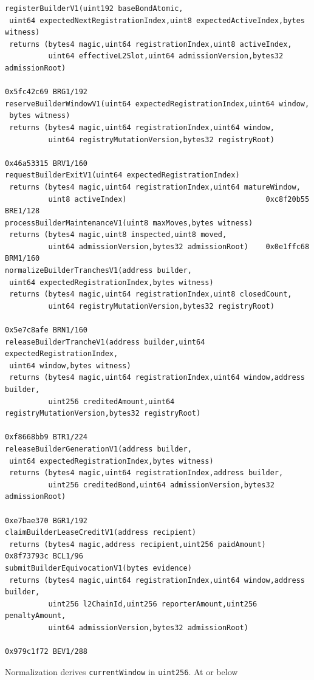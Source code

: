 \documentclass[a4paper,11pt]{article}
\newcommand{\code}[1]{\nolinkurl{#1}}
\begin{document}
\begin{verbatim}
registerBuilderV1(uint192 baseBondAtomic,
 uint64 expectedNextRegistrationIndex,uint8 expectedActiveIndex,bytes witness)
 returns (bytes4 magic,uint64 registrationIndex,uint8 activeIndex,
          uint64 effectiveL2Slot,uint64 admissionVersion,bytes32 admissionRoot)
                                                             0x5fc42c69 BRG1/192
reserveBuilderWindowV1(uint64 expectedRegistrationIndex,uint64 window,
 bytes witness)
 returns (bytes4 magic,uint64 registrationIndex,uint64 window,
          uint64 registryMutationVersion,bytes32 registryRoot)
                                                             0x46a53315 BRV1/160
requestBuilderExitV1(uint64 expectedRegistrationIndex)
 returns (bytes4 magic,uint64 registrationIndex,uint64 matureWindow,
          uint8 activeIndex)                                0xc8f20b55 BRE1/128
processBuilderMaintenanceV1(uint8 maxMoves,bytes witness)
 returns (bytes4 magic,uint8 inspected,uint8 moved,
          uint64 admissionVersion,bytes32 admissionRoot)    0x0e1ffc68 BRM1/160
normalizeBuilderTranchesV1(address builder,
 uint64 expectedRegistrationIndex,bytes witness)
 returns (bytes4 magic,uint64 registrationIndex,uint8 closedCount,
          uint64 registryMutationVersion,bytes32 registryRoot)
                                                             0x5e7c8afe BRN1/160
releaseBuilderTrancheV1(address builder,uint64 expectedRegistrationIndex,
 uint64 window,bytes witness)
 returns (bytes4 magic,uint64 registrationIndex,uint64 window,address builder,
          uint256 creditedAmount,uint64 registryMutationVersion,bytes32 registryRoot)
                                                             0xf8668bb9 BTR1/224
releaseBuilderGenerationV1(address builder,
 uint64 expectedRegistrationIndex,bytes witness)
 returns (bytes4 magic,uint64 registrationIndex,address builder,
          uint256 creditedBond,uint64 admissionVersion,bytes32 admissionRoot)
                                                             0xe7bae370 BGR1/192
claimBuilderLeaseCreditV1(address recipient)
 returns (bytes4 magic,address recipient,uint256 paidAmount) 0x8f73793c BCL1/96
submitBuilderEquivocationV1(bytes evidence)
 returns (bytes4 magic,uint64 registrationIndex,uint64 window,address builder,
          uint256 l2ChainId,uint256 reporterAmount,uint256 penaltyAmount,
          uint64 admissionVersion,bytes32 admissionRoot)
                                                             0x979c1f72 BEV1/288
\end{verbatim}
Normalization derives \code{currentWindow} in \code{uint256}.  At or below
\end{document}
